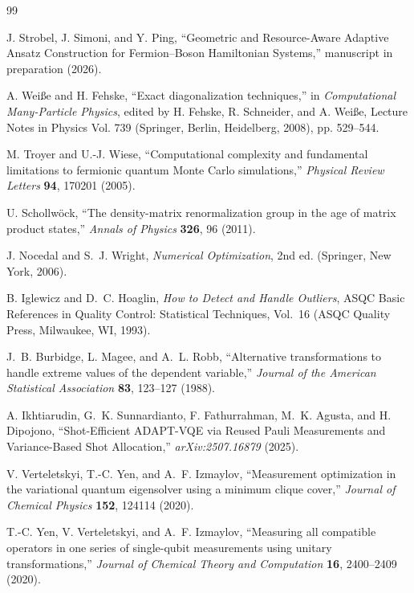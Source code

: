 \documentclass[
  reprint,
  amsmath,
  amssymb,
  aps,
  pra,
  nofootinbib,
  superscriptaddress,
  floatfix
]{revtex4-2}
\begin{document}
\begin{thebibliography}{99}

J. Strobel, J. Simoni, and Y. Ping,
``Geometric and Resource-Aware Adaptive Ansatz Construction for Fermion--Boson Hamiltonian Systems,''
manuscript in preparation (2026).

A. Wei{\ss}e and H. Fehske,
``Exact diagonalization techniques,''
in \emph{Computational Many-Particle Physics},
edited by H. Fehske, R. Schneider, and A. Wei{\ss}e,
Lecture Notes in Physics Vol. 739 (Springer, Berlin, Heidelberg, 2008), pp. 529--544.

M. Troyer and U.-J. Wiese,
``Computational complexity and fundamental limitations to fermionic quantum Monte Carlo simulations,''
\emph{Physical Review Letters} \textbf{94}, 170201 (2005).

U. Schollw\"ock,
``The density-matrix renormalization group in the age of matrix product states,''
\emph{Annals of Physics} \textbf{326}, 96 (2011).

J. Nocedal and S.~J. Wright,
\emph{Numerical Optimization}, 2nd ed.
(Springer, New York, 2006).

B. Iglewicz and D.~C. Hoaglin,
\emph{How to Detect and Handle Outliers},
ASQC Basic References in Quality Control: Statistical Techniques, Vol.~16
(ASQC Quality Press, Milwaukee, WI, 1993).

J.~B. Burbidge, L. Magee, and A.~L. Robb,
``Alternative transformations to handle extreme values of the dependent variable,''
\emph{Journal of the American Statistical Association} \textbf{83}, 123--127 (1988).

A. Ikhtiarudin, G.~K. Sunnardianto, F. Fathurrahman, M.~K. Agusta, and H. Dipojono,
``Shot-Efficient ADAPT-VQE via Reused Pauli Measurements and Variance-Based Shot Allocation,''
\emph{arXiv:2507.16879} (2025).

V. Verteletskyi, T.-C. Yen, and A.~F. Izmaylov,
``Measurement optimization in the variational quantum eigensolver using a minimum clique cover,''
\emph{Journal of Chemical Physics} \textbf{152}, 124114 (2020).

T.-C. Yen, V. Verteletskyi, and A.~F. Izmaylov,
``Measuring all compatible operators in one series of single-qubit measurements using unitary transformations,''
\emph{Journal of Chemical Theory and Computation} \textbf{16}, 2400--2409 (2020).


\end{thebibliography}
\end{document}
